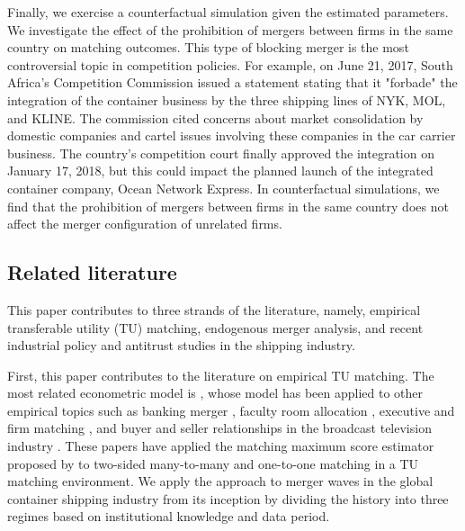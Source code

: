 \documentclass[10pt]{article}
\begin{document}
Finally, we exercise a counterfactual simulation given the estimated parameters. 
We investigate the effect of the prohibition of mergers between firms in the same country on matching outcomes. This type of blocking merger is the most controversial topic in competition policies. 
For example, on June 21, 2017, South Africa's Competition Commission issued a statement stating that it "forbade" the integration of the container business by the three shipping lines of NYK, MOL, and KLINE. 
The commission cited concerns about market consolidation by domestic companies and cartel issues involving these companies in the car carrier business.
The country's competition court finally approved the integration on January 17, 2018, but this could impact the planned launch of the integrated container company, Ocean Network Express.
In counterfactual simulations, we find that the prohibition of mergers between firms in the same country does not affect the merger configuration of unrelated firms.


\subsection{Related literature}

This paper contributes to three strands of the literature, namely, empirical transferable utility (TU) matching, endogenous merger analysis, and recent industrial policy and antitrust studies in the shipping industry.

First, this paper contributes to the literature on empirical TU matching. 
The most related econometric model is \cite{fox2018qe}, whose model has been applied to other empirical topics such as banking merger \citep{akkus2015ms,chen2013ijio}, faculty room allocation \citep{baccara2012aer}, executive and firm matching \citep{pan2017determinants}, and buyer and seller relationships in the broadcast television industry \citep{stahl2016aer}. 
These papers have applied the matching maximum score estimator proposed by \cite{fox2010qe,fox2018qe} to two-sided many-to-many and one-to-one matching in a TU matching environment. 
We apply the approach to merger waves in the global container shipping industry from its inception by dividing the history into three regimes based on institutional knowledge and data period.
\end{document}
